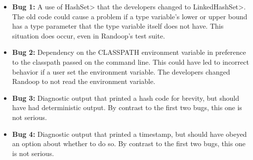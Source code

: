 \begin{itemize}
\item \textbf{Bug 1:}
  A use of \<HashSet> that the developers changed to \<LinkedHashSet>.
The old code could cause a problem if a type variable's lower or upper
bound has a type parameter that the type variable itself does not have.
This situation does occur, even in Randoop's test suite.

\item \textbf{Bug 2:}
Dependency on the CLASSPATH environment variable in preference to the
classpath passed on the command line.
This could have led to incorrect behavior if a user set the environment variable.
The developers changed Randoop to not read the environment variable.

\item \textbf{Bug 3:}
Diagnostic output that printed a hash code for brevity, but should have had
deterministic output.  By contrast to the first two bugs,
this one is not serious.

\item \textbf{Bug 4:}
Diagnostic output that printed a timestamp, but should have obeyed an
option about whether to do so.  By contrast to the first
two bugs, this one is not serious.

\end{itemize}

